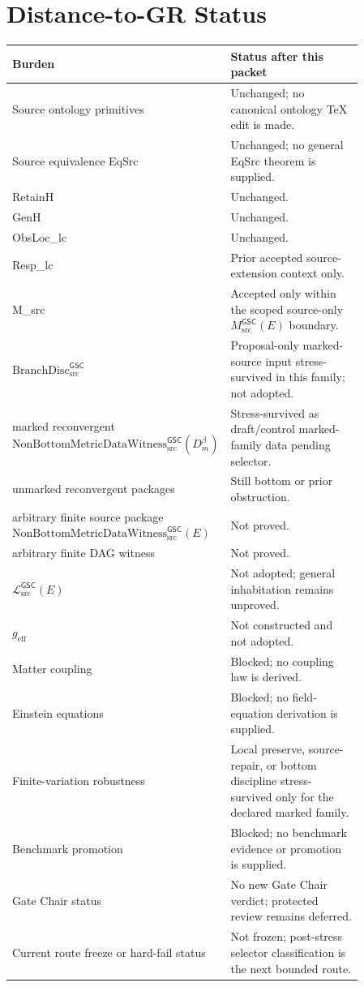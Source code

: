 \documentclass[11pt]{article}
\newcommand{\Witness}{\mathrm{NonBottomMetricDataWitness}_{\mathrm{src}}^{\mathsf{GSC}}}
\newcommand{\MetricData}{\mathcal{L}_{\mathrm{src}}^{\mathsf{GSC}}}
\newcommand{\geff}{g_{\mathrm{eff}}}
\newcommand{\BranchDisc}{\mathrm{BranchDisc}_{\mathrm{src}}^{\mathsf{GSC}}}
\newcommand{\Dmbeta}{D_m^{\beta}}
\begin{document}
\section{Distance-to-GR Status}

\begin{longtable}{p{0.30\linewidth}p{0.56\linewidth}}
\toprule
Burden & Status after this packet \\
\midrule
Source ontology primitives & Unchanged; no canonical ontology TeX edit is made. \\
Source equivalence EqSrc & Unchanged; no general EqSrc theorem is supplied. \\
RetainH & Unchanged. \\
GenH & Unchanged. \\
ObsLoc\_lc & Unchanged. \\
Resp\_lc & Prior accepted source-extension context only. \\
M\_src & Accepted only within the scoped source-only \(M_{\mathrm{src}}^{\mathsf{GSC}}(E)\) boundary. \\
\(\BranchDisc\) & Proposal-only marked-source input stress-survived in this family; not adopted. \\
marked reconvergent \(\Witness(\Dmbeta)\) & Stress-survived as draft/control marked-family data pending selector. \\
unmarked reconvergent packages & Still bottom or prior obstruction. \\
arbitrary finite source package \(\Witness(E)\) & Not proved. \\
arbitrary finite DAG witness & Not proved. \\
\(\MetricData(E)\) & Not adopted; general inhabitation remains unproved. \\
\(\geff\) & Not constructed and not adopted. \\
Matter coupling & Blocked; no coupling law is derived. \\
Einstein equations & Blocked; no field-equation derivation is supplied. \\
Finite-variation robustness & Local preserve, source-repair, or bottom discipline stress-survived only for the declared marked family. \\
Benchmark promotion & Blocked; no benchmark evidence or promotion is supplied. \\
Gate Chair status & No new Gate Chair verdict; protected review remains deferred. \\
Current route freeze or hard-fail status & Not frozen; post-stress selector classification is the next bounded route. \\
\bottomrule
\end{longtable}
\end{document}
